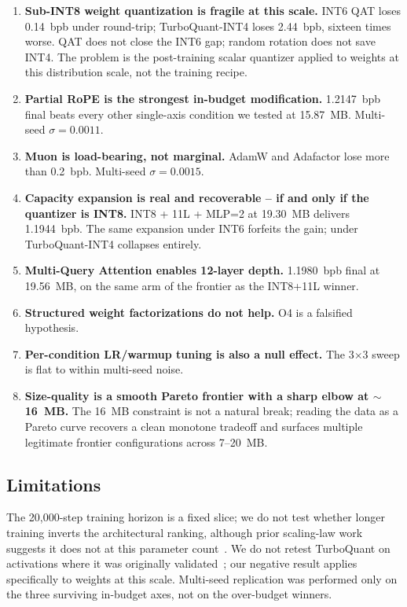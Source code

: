 \documentclass[sigconf,nonacm,natbib=false]{acmart}
\renewcommand{\_}{\discretionary{\char`\_}{}{\char`\_}}
\begin{document}
\begin{enumerate}[leftmargin=*]
    \item \textbf{Sub-INT8 weight quantization is fragile at this scale.}
          INT6 QAT loses 0.14~bpb under round-trip; TurboQuant-INT4
          loses 2.44~bpb, sixteen times worse. QAT does not close the
          INT6 gap; random rotation does not save INT4. The problem is
          the post-training scalar quantizer applied to weights at
          this distribution scale, not the training recipe.
    \item \textbf{Partial RoPE is the strongest in-budget modification.}
          1.2147~bpb final beats every other single-axis condition we
          tested at 15.87~MB. Multi-seed $\sigma{=}0.0011$.
    \item \textbf{Muon is load-bearing, not marginal.} AdamW and
          Adafactor lose more than 0.2~bpb. Multi-seed $\sigma{=}0.0015$.
    \item \textbf{Capacity expansion is real and recoverable -- if and
          only if the quantizer is INT8.} INT8 + 11L + MLP=2 at
          19.30~MB delivers 1.1944~bpb. The same expansion under INT6
          forfeits the gain; under TurboQuant-INT4 collapses entirely.
    \item \textbf{Multi-Query Attention enables 12-layer depth.}
          1.1980~bpb final at 19.56~MB, on the same arm of the
          frontier as the INT8+11L winner.
    \item \textbf{Structured weight factorizations do not help.} O4 is
          a falsified hypothesis.
    \item \textbf{Per-condition LR/warmup tuning is also a null effect.}
          The 3$\times$3 sweep is flat to within multi-seed noise.
    \item \textbf{Size-quality is a smooth Pareto frontier with a sharp
          elbow at $\sim$16~MB.} The 16~MB constraint is not a natural
          break; reading the data as a Pareto curve recovers a clean
          monotone tradeoff and surfaces multiple legitimate frontier
          configurations across 7--20~MB.
\end{enumerate}

\subsection{Limitations}

The 20{,}000-step training horizon is a fixed slice; we do not test
whether longer training inverts the architectural ranking, although
prior scaling-law work suggests it does not at this parameter
count~\cite{kaplan2020}. We do not retest TurboQuant on activations
where it was originally validated~\cite{turboquant2024}; our negative
result applies specifically to weights at this scale. Multi-seed
replication was performed only on the three surviving in-budget axes,
not on the over-budget winners.
\end{document}
